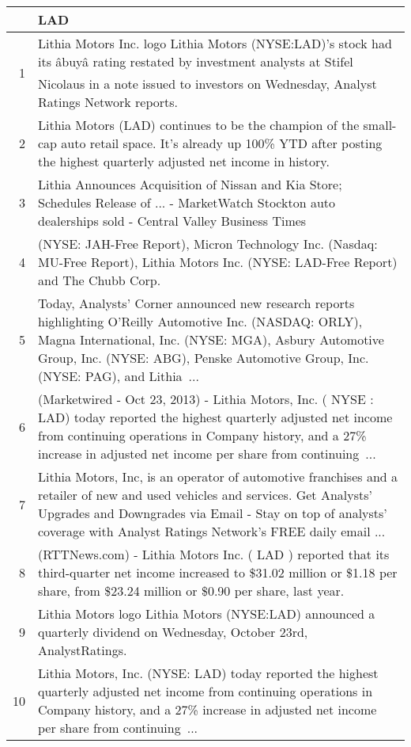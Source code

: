 \documentclass{tufte-handout}\usepackage[]{graphicx}\usepackage[]{color}
\begin{document}
\begin{tabularx}{\textwidth}{rX}
  \hline
 & LAD \\ 
  \hline
1 &  Lithia Motors Inc. logo Lithia Motors (NYSE:LAD)'s stock had its âbuyâ rating restated by investment analysts at Stifel Nicolaus in a note issued to investors on Wednesday, Analyst Ratings Network reports.  \\ 
  2 &  Lithia Motors (LAD) continues to be the champion of the small-cap auto retail space. It's already up 100\% YTD after posting the highest quarterly adjusted net income in history.  \\ 
  3 &  Lithia Announces Acquisition of Nissan and Kia Store; Schedules Release of ...  -  MarketWatch Stockton auto dealerships sold  -  Central Valley Business Times \\ 
  4 &  (NYSE: JAH-Free Report), Micron Technology Inc. (Nasdaq: MU-Free Report), Lithia Motors Inc. (NYSE: LAD-Free Report) and The Chubb Corp.  \\ 
  5 &  Today, Analysts' Corner announced new research reports highlighting O'Reilly Automotive Inc. (NASDAQ: ORLY), Magna International, Inc. (NYSE: MGA), Asbury Automotive Group, Inc. (NYSE: ABG), Penske Automotive Group, Inc. (NYSE: PAG), and Lithia ...  \\ 
  6 & (Marketwired - Oct 23, 2013) - Lithia Motors, Inc. ( NYSE : LAD) today reported the highest quarterly adjusted net income from continuing operations in Company history, and a 27\% increase in adjusted net income per share from continuing ...  \\ 
  7 &  Lithia Motors, Inc, is an operator of automotive franchises and a retailer of new and used vehicles and services. Get Analysts' Upgrades and Downgrades via Email - Stay on top of analysts' coverage with Analyst Ratings Network's FREE daily email ...  \\ 
  8 &  (RTTNews.com) - Lithia Motors Inc. ( LAD ) reported that its third-quarter net income increased to \$31.02 million or \$1.18 per share, from \$23.24 million or \$0.90 per share, last year.  \\ 
  9 &  Lithia Motors logo Lithia Motors (NYSE:LAD) announced a quarterly dividend on Wednesday, October 23rd, AnalystRatings.  \\ 
  10 &  Lithia Motors, Inc. (NYSE: LAD) today reported the highest quarterly adjusted net income from continuing operations in Company history, and a 27\% increase in adjusted net income per share from continuing ...  \\ 
   \hline
\end{tabularx}
\end{document}
